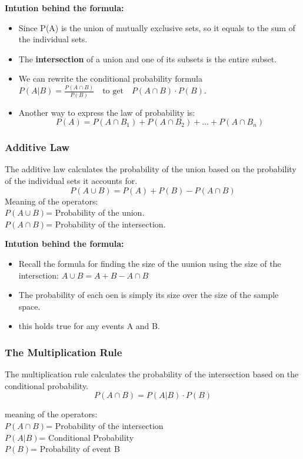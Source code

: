 \documentclass{article}
\begin{document}
\textbf{Intution behind the formula:}
\begin{itemize}
  \item Since P(A) is the union of mutually exclusive sets, so it equals to the
    sum of the individual sets.

  \item The \textbf{intersection} of a union and one of its subsets is the entire subset.

  \item We can rewrite the conditional probability formula 
    \subitem $P(A|B)=\frac{P(A \cap B)}{P(B)} \quad \text{to get} \quad P(A\cap B) \cdot P(B)$.

  \item Another way to express the law of probability is:
    \[P(A)=P(A \cap B_1)+P(A \cap B_2)+ \dots + P(A\cap B_n)\]
\end{itemize}

\subsubsection{Additive Law}
The additive law calculates the probability of the union based on the
probability of the individual sets it accounts for.
\[P(A\cup B) = P(A) + P(B) - P(A \cap B)\]
Meaning of the operators:\\
$P(A \cup B)$= Probability of the union.\\
$P(A \cap B)$= Probability of the intersection.

\textbf{Intution behind the formula:}
\begin{itemize}
  \item Recall the formula for finding the size of the uunion using the size of the intersction:
    \subitem $A\cup B = A+B - A \cap B$
  \item The probability of each oen is simply its size over the size of the sample space.
  \item this holds true for any events A and B.
\end{itemize}


\subsubsection{The Multiplication Rule}
The multiplication rule calculates the probability of the intersection based on the conditional probability.
\[ P(A\cap B) = P(A|B)\cdot P(B) \]

meaning of the operators:\\
$P(A\cap B)$= Probability of the intersection\\
$P(A|B)$= Conditional Probability\\
$P(B)$= Probability of event B
\end{document}
